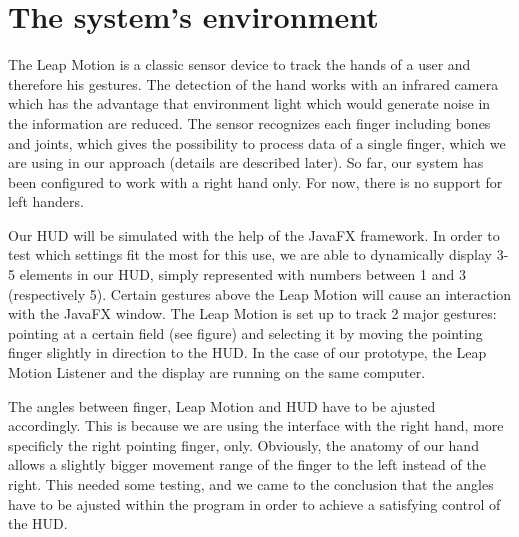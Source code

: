 \documentclass{sigchi-ext}
\begin{document}
\section{The system's environment}
The Leap Motion is a classic sensor device to track the hands of a user and therefore his gestures.
The detection of the hand works with an infrared camera which has the advantage that environment light
which would generate noise in the information are reduced. The sensor recognizes each finger including
bones and joints, which gives the possibility to process data of a single finger, which we are using in
our approach (details are described later). So far, our system has been configured to work with a right hand only.
For now, there is no support for left handers.\linebreak

Our HUD will be simulated with the help of the JavaFX framework. In order to test which settings fit the most for this use,
we are able to dynamically display 3-5 elements in our HUD, simply represented with numbers between 1 and 3 (respectively 5).
Certain gestures above the Leap Motion will cause an interaction with the JavaFX window.
The Leap Motion is set up to track 2 major gestures: pointing at a certain field (see figure)
and selecting it by moving the pointing finger slightly in direction to the HUD. In the case of our prototype,
the Leap Motion Listener and the display are running on the same computer.\linebreak

The angles between finger, Leap Motion and HUD have to be ajusted accordingly. This is because we are using the
interface with the right hand, more specificly the right pointing finger, only. Obviously, the anatomy of our hand
allows a slightly bigger movement range of the finger to the left instead of the right. This needed some testing, and we came to
the conclusion that the angles have to be ajusted within the program in order to achieve a satisfying control of the HUD.

\balance{} 



\end{document}
